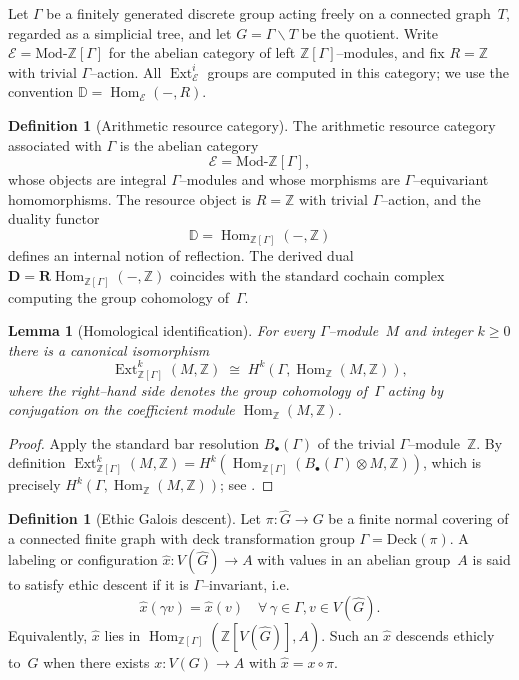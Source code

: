 \documentclass[12pt]{article}
\newcommand{\E}{\mathcal{E}}
\newcommand{\Hom}{\operatorname{Hom}}
\newcommand{\Ext}{\operatorname{Ext}}
\newcommand{\RHom}{\mathbf{R}\!\operatorname{Hom}}
\theoremstyle{plain}
\newtheorem{lemma}[theorem]{Lemma}
\theoremstyle{definition}
\newtheorem{definition}[theorem]{Definition}
\theoremstyle{remark}
\numberwithin{equation}{section}
\begin{document}
\medskip
Let $\Gamma$ be a finitely generated discrete group acting freely on a connected graph~$T$, regarded as a simplicial tree, and let $G=\Gamma\backslash T$ be the quotient.  
Write $\E=\mathrm{Mod}\text{-}\mathbb Z[\Gamma]$ for the abelian category of left $\mathbb Z[\Gamma]$--modules, and fix $R=\mathbb Z$ with trivial $\Gamma$--action.  
All $\Ext^i_{\E}$ groups are computed in this category; we use the convention $\mathbb D=\Hom_{\E}(-,R)$.

\begin{definition}[Arithmetic resource category]
The arithmetic resource category associated with $\Gamma$ is the abelian category
\[
\E = \mathrm{Mod}\text{-}\mathbb Z[\Gamma],
\]
whose objects are integral $\Gamma$--modules and whose morphisms are $\Gamma$--equivariant homomorphisms.  
The resource object is $R=\mathbb Z$ with trivial $\Gamma$--action, and the duality functor
\[
\mathbb D = \Hom_{\mathbb Z[\Gamma]}(-,\mathbb Z)
\]
defines an internal notion of reflection.  The derived dual $\mathbf D=\RHom_{\mathbb Z[\Gamma]}(-,\mathbb Z)$ coincides with the standard cochain complex computing the group cohomology of~$\Gamma$.
\end{definition}

\begin{lemma}[Homological identification]\label{lem:groupcoh}
For every $\Gamma$--module~$M$ and integer $k\ge0$ there is a canonical isomorphism
\[
\Ext^k_{\mathbb Z[\Gamma]}(M,\mathbb Z)\;\cong\; H^k(\Gamma,\Hom_{\mathbb Z}(M,\mathbb Z)),
\]
where the right--hand side denotes the group cohomology of~$\Gamma$ acting by conjugation on the coefficient module $\Hom_{\mathbb Z}(M,\mathbb Z)$.
\end{lemma}

\begin{proof}
Apply the standard bar resolution $B_\bullet(\Gamma)$ of the trivial $\Gamma$--module~$\mathbb Z$.  
By definition $\Ext^k_{\mathbb Z[\Gamma]}(M,\mathbb Z)=H^k(\Hom_{\mathbb Z[\Gamma]}(B_\bullet(\Gamma)\otimes M,\mathbb Z))$, which is precisely $H^k(\Gamma,\Hom_{\mathbb Z}(M,\mathbb Z))$; see \cite{Brown1982}.
\end{proof}

\begin{definition}[Ethic Galois descent]
Let $\pi:\widehat G\to G$ be a finite normal covering of a connected finite graph with deck transformation group $\Gamma=\mathrm{Deck}(\pi)$.  
A labeling or configuration $\widehat x:V(\widehat G)\to A$ with values in an abelian group~$A$ is said to satisfy ethic descent if it is $\Gamma$--invariant, i.e.
\[
\widehat x(\gamma v)=\widehat x(v)\quad\forall\,\gamma\in\Gamma,v\in V(\widehat G).
\]
Equivalently, $\widehat x$ lies in $\Hom_{\mathbb Z[\Gamma]}(\mathbb Z[V(\widehat G)],A)$.  
Such an $\widehat x$ descends ethicly to~$G$ when there exists $x:V(G)\to A$ with $\widehat x=x\circ\pi$.
\end{definition}
\end{document}

